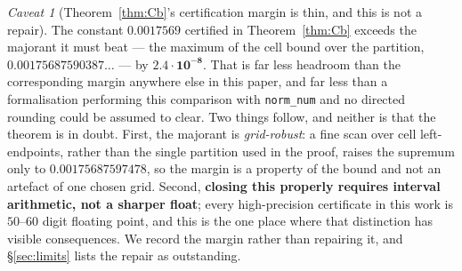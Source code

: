 \documentclass[11pt,a4paper]{article}
\theoremstyle{plain}
\theoremstyle{definition}
\theoremstyle{remark}
\newtheorem{hazard}[theorem]{Caveat}
\begin{document}
\begin{hazard}[Theorem~\ref{thm:Cb}'s certification margin is thin, and this is not a repair]
\label{haz:margin}
The constant $0.0017569$ certified in Theorem~\ref{thm:Cb} exceeds the majorant it must beat
--- the maximum of the cell bound over the partition, $0.00175687590387\ldots$ --- by
$\mathbf{2.4\cdot10^{-8}}$. That is far less headroom than the corresponding margin anywhere
else in this paper, and far less than a formalisation performing this comparison with
\texttt{norm\_num} and no directed rounding could be assumed to clear. Two things follow, and
neither is that the theorem is in doubt. First, the majorant is \emph{grid-robust}: a fine
scan over cell left-endpoints, rather than the single partition used in the proof, raises the
supremum only to $0.00175687597478$, so the margin is a property of the bound and not an
artefact of one chosen grid. Second, \textbf{closing this properly requires interval
arithmetic, not a sharper float}; every high-precision certificate in this work is $50$--$60$
digit floating point, and this is the one place where that distinction has visible
consequences. We record the margin rather than repairing it, and \S\ref{sec:limits} lists the
repair as outstanding.
\end{hazard}
\end{document}
